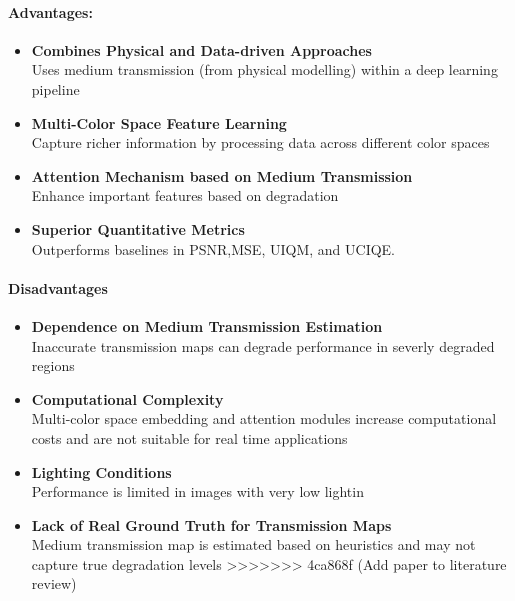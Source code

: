 \documentclass{article}
\begin{document}
\paragraph{Advantages:}
\begin{itemize}
    \item \textbf{Combines Physical and Data-driven Approaches} \\
          Uses medium transmission (from physical modelling) within a deep learning pipeline

    \item \textbf{Multi-Color Space Feature Learning} \\
          Capture richer information by processing data across different color spaces
    
    \item \textbf{Attention Mechanism based on Medium Transmission} \\
          Enhance important features based on degradation

    \item \textbf{Superior Quantitative Metrics} \\
          Outperforms baselines in PSNR,MSE, UIQM, and UCIQE.
\end{itemize}

\paragraph{Disadvantages}

\begin{itemize}
    \item \textbf{Dependence on Medium Transmission Estimation} \\
          Inaccurate transmission maps can degrade performance in severly degraded regions

    \item \textbf{Computational Complexity} \\
          Multi-color space embedding and attention modules increase computational costs and are not suitable for real time applications

    \item \textbf{Lighting Conditions} \\
          Performance is limited in images with very low lightin

    \item \textbf{Lack of Real Ground Truth for Transmission Maps} \\
          Medium transmission map is estimated based on heuristics and may not capture true degradation levels
>>>>>>> 4ca868f (Add paper to literature review)
\end{itemize}
\end{document}
